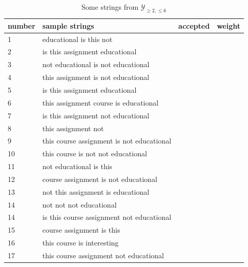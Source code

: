 \documentclass{article}
\begin{document}
\clearpage
\newpage

\begin{table}[h]
        \centering
        \fontsize{10}{10}\selectfont
        \renewcommand{\arraystretch}{1.2} %
        \setlength{\tabcolsep}{0.5em} %
        \begin{tabular}{l|l|l|l}
        \textbf{number} & \textbf{sample strings} & \textbf{accepted} & \textbf{weight} \\ \hline
        1 & educational is this not &  &  \\
        2 & is this assignment educational &  &  \\
        3 & not educational is not educational &  &  \\
        4 & this assignment is not educational &  &  \\
        5 & is this assignment educational &  &  \\
        6 & this assignment course is educational &  &  \\
        7 & is this assignment not educational &  &  \\
        8 & this assignment not &  &  \\
        9 & this course assignment is not educational &  &  \\
        10 & this course is not not educational &  &  \\
        11 & not educational is this &  &  \\
        12 & course assignment is not educational &  &  \\
        13 & not this assignment is educational &  &  \\
        14 & not not not educational &  &  \\
        14 & is this course assignment not educational &  &  \\
        15 & course assignment is this &  &  \\
        16 & this course is interesting &  &  \\
        17 & this course assignment not educational &  & 
        \end{tabular}
        \caption{Some strings from $\mathcal{Y}_{\geq 2, \leq 6}$}
        \label{tab:wfst_strings}
        \end{table}
        
\end{document}

